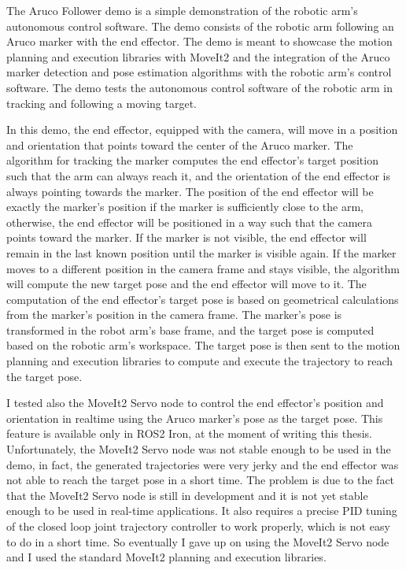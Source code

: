 The Aruco Follower demo is a simple demonstration of the robotic arm's autonomous control software. The demo
consists of the robotic arm following an Aruco marker with the end effector. The demo is meant to showcase the
motion planning and execution libraries with MoveIt2 and the integration of the Aruco marker detection 
and pose estimation algorithms with the robotic arm's control software.
The demo tests the autonomous control software of the robotic arm in tracking and following a moving target. 

In this demo, the end effector,
equipped with the camera, will move in a position and orientation that points toward the center of the
Aruco marker. The algorithm for tracking the marker computes the end effector's target position such that
the arm can always reach it, and the orientation of the end effector is always pointing towards the marker.
The position of the end effector will be exactly the marker's position if the marker is sufficiently close to the arm,
otherwise, the end effector will be positioned in a way such that the camera points toward the marker.
If the marker is not visible, the end effector will remain in the last known position until the marker is
visible again. If the marker moves to a different position in the camera frame and stays visible,
the algorithm will compute the new target pose and the end effector will move to it.
The computation of the end effector's target pose is based on geometrical calculations from the marker's position
in the camera frame. The marker's pose is transformed in the robot arm's base frame, and the target pose is
computed based on the robotic arm's workspace. The target pose is then sent to the motion planning and execution
libraries to compute and execute the trajectory to reach the target pose.

I tested also the MoveIt2 Servo node to control the end effector's position and orientation in realtime
using the Aruco marker's pose as the target pose. This feature is available only in ROS2 Iron, at the moment
of writing this thesis. Unfortunately, the MoveIt2 Servo node was not stable enough to be used in the demo,
in fact, the generated trajectories were very jerky and the end effector was not able to reach the target
pose in a short time. The problem is due to the fact that the MoveIt2 Servo node is still in development
and it is not yet stable enough to be used in real-time applications. It also requires a precise PID tuning
of the closed loop joint trajectory controller to work properly, which is not easy to do in a short time.
So eventually I gave up on using the MoveIt2 Servo node and I used the standard MoveIt2 planning and execution
libraries.

